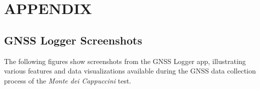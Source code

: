 
\section{APPENDIX} \label{sec:appendix}


    \subsection{GNSS Logger Screenshots}

        \noindent The following figures show screenshots from the GNSS Logger app, illustrating various features and data visualizations available during the GNSS data collection process of the \textit{Monte dei Cappuccini} test.

